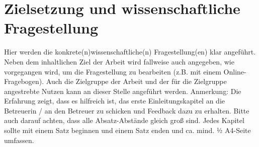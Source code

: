 

\section{Zielsetzung und wissenschaftliche Fragestellung} \label{cha:researchQuestion}

Hier werden die konkrete(n)wissenschaftliche(n) Fragestellung(en) klar angeführt. Neben dem inhaltlichen Ziel der Arbeit wird fallweise auch angegeben, wie vorgegangen wird, um die Fragestellung zu bearbeiten (z.B. mit einem Online-Fragebogen). Auch die Zielgruppe der Arbeit und der für die Zielgruppe angestrebte Nutzen kann an dieser Stelle angeführt werden.
Anmerkung: 
Die Erfahrung zeigt, dass es hilfreich ist, das erste Einleitungskapitel an die Betreuerin / an den Betreuer zu schicken und Feedback dazu zu erhalten.
Bitte auch darauf achten, dass alle Absatz-Abstände gleich groß sind.
Jedes Kapitel sollte mit einem Satz beginnen und einem Satz enden und ca. mind. ½ A4-Seite umfassen. 
